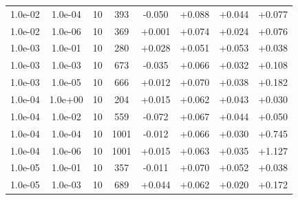 \documentclass[11pt,a4paper]{article}
\begin{document}
\begin{table}[t]
{\begin{tabular}{*{8}c}
 1.0e-02 	 & 1.0e-04 	 & 10 & 393 	 & -0.050 & +0.088 & +0.044 & +0.077 \\ 
 1.0e-02 	 & 1.0e-06 	 & 10 & 369 	 & +0.001 & +0.074 & +0.024 & +0.076 \\ 
 1.0e-03 	 & 1.0e-01 	 & 10 & 280 	 & +0.028 & +0.051 & +0.053 & +0.038 \\ 
 \rowcolor{orange} 1.0e-03 	 & 1.0e-03 	 & 10 & 673 	 & -0.035 & +0.066 & +0.032 & +0.108 \\ 
 \rowcolor{orange} 1.0e-03 	 & 1.0e-05 	 & 10 & 666 	 & +0.012 & +0.070 & +0.038 & +0.182 \\ 
 1.0e-04 	 & 1.0e+00 	 & 10 & 204 	 & +0.015 & +0.062 & +0.043 & +0.030 \\ 
 1.0e-04 	 & 1.0e-02 	 & 10 & 559 	 & -0.072 & +0.067 & +0.044 & +0.050 \\ 
\rowcolor{red}  1.0e-04 	 & 1.0e-04 	 & 10 & 1001 	 & -0.012 & +0.066 & +0.030 & +0.745 \\ 
\rowcolor{red} 1.0e-04 	 & 1.0e-06 	 & 10 & 1001 	 & +0.015 & +0.063 & +0.035 & +1.127 \\ 
 1.0e-05 	 & 1.0e-01 	 & 10 & 357 	 & -0.011 & +0.070 & +0.052 & +0.038 \\ 
 \rowcolor{orange} 1.0e-05 	 & 1.0e-03 	 & 10 & 689 	 & +0.044 & +0.062 & +0.020 & +0.172 \\ 

\end{tabular}}
\end{table}
\end{document}
